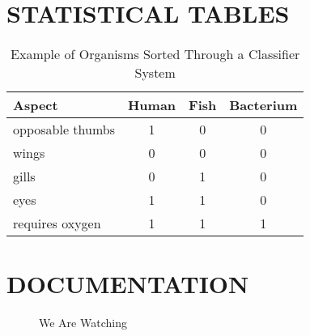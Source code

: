 \documentclass{strrespaper-trad}
\begin{document}
    \section{STATISTICAL TABLES}
    \begin{table}[htbp]
        \centering
        \begin{tabular}{lccc}
            \toprule
            Aspect           & Human & Fish & Bacterium \\
            \midrule
            opposable thumbs & 1     & 0    & 0         \\
            wings            & 0     & 0    & 0         \\
            gills            & 0     & 1    & 0         \\
            eyes             & 1     & 1    & 0         \\
            requires oxygen  & 1     & 1    & 1         \\
            \bottomrule
        \end{tabular}
        \caption{Example of Organisms Sorted Through a Classifier System}
        \label{tab:ex_classifier}
    \end{table}

	\section{DOCUMENTATION}
		\begin{figure}[htbp]
			\centering
			 \qquad 

            \quad

			 \qquad 
			\caption{We Are Watching}
			\label{fig:waw}
		\end{figure}
\end{document}
